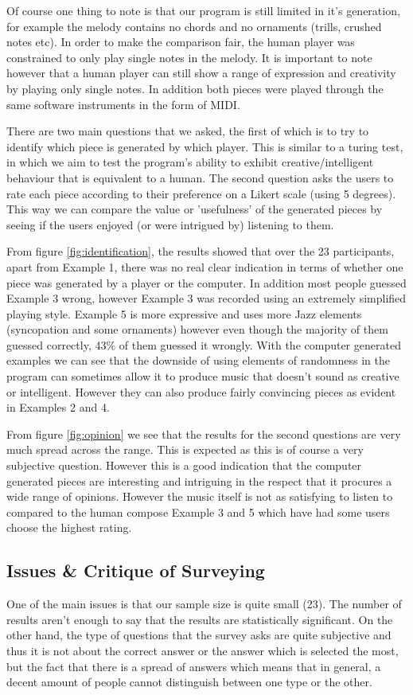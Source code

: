 \documentclass[pdftex,12pt,a4paper]{report}
\begin{document}
Of course one thing to note is that our program is still limited in it's generation, for example the melody contains no chords and no ornaments (trills, crushed notes etc). In order to make the comparison fair, the human player was constrained to only play single notes in the melody. It is important to note however that a human player can still show a range of expression and creativity by playing only single notes. In addition both pieces were played through the same software instruments in the form of MIDI.

There are two main questions that we asked, the first of which is to try to identify which piece is generated by which player. This is similar to a turing test, in which we aim to test the program's ability to exhibit creative/intelligent behaviour that is equivalent to a human. The second question asks the users to rate each piece according to their preference on a Likert scale (using 5 degrees). This way we can compare the value or 'usefulness' of the generated pieces by seeing if the users enjoyed (or were intrigued by) listening to them.

From figure \ref{fig:identification}, the results showed that over the 23 participants, apart from Example 1, there was no real clear indication in terms of whether one piece was generated by a player or the computer. In addition most people guessed Example 3 wrong, however Example 3 was recorded using an extremely simplified playing style. Example 5 is more expressive and uses more Jazz elements (syncopation and some ornaments) however even though the majority of them guessed correctly, 43\% of them guessed it wrongly. With the computer generated examples we can see that the downside of using elements of randomness in the program can sometimes allow it to produce music that doesn't sound as creative or intelligent. However they can also produce fairly convincing pieces as evident in Examples 2 and 4.

From figure \ref{fig:opinion} we see that the results for the second questions are very much spread across the range. This is expected as this is of course a very subjective question. However this is a good indication that the computer generated pieces are interesting and intriguing in the respect that it procures a wide range of opinions. However the music itself is not as satisfying to listen to compared to the human compose Example 3 and 5 which have had some users choose the highest rating.  


\subsection{Issues \& Critique of Surveying}
One of the main issues is that our sample size is quite small (23). The number of results aren't enough to say that the results are statistically significant. On the other hand, the type of questions that the survey asks are quite subjective and thus it is not about the correct answer or the answer which is selected the most, but the fact that there is a spread of answers which means that in general, a decent amount of people cannot distinguish between one type or the other. 
\end{document}
